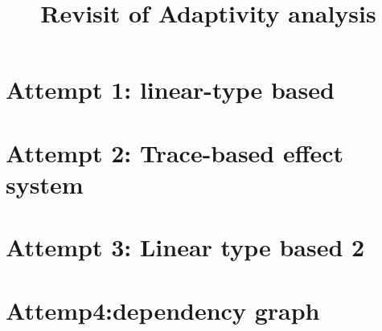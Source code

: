 \documentclass[a4paper,11pt]{article}
\title{Revisit of Adaptivity analysis}
\author{}
\date{}
\theoremstyle{definition}
\begin{document}
\maketitle

\section{Attempt 1: linear-type based}



\section{Attempt 2: Trace-based effect system}



\clearpage
\section{Attempt 3: Linear type based 2}




\section{Attemp4:dependency graph}






\end{document}
